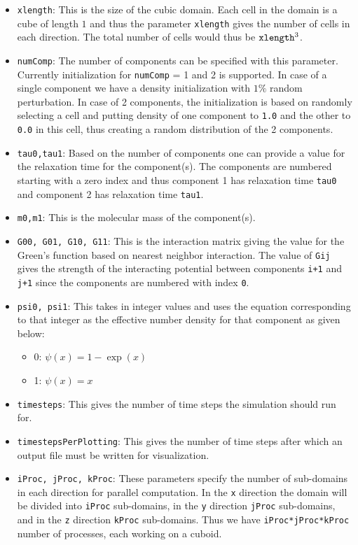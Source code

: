 \documentclass[11pt]{article}
\begin{document}
\begin{itemize}
	\item \verb|xlength|: This is the size of the cubic domain. Each cell in the domain is a cube of length $1$ and thus the parameter \verb|xlength| gives the number of cells in each direction. The total number of cells would thus be $\verb|xlength|^3$.
	\item \verb|numComp|: The number of components can be specified with this parameter. Currently initialization for \verb|numComp| = 1 and 2 is supported. In case of a single component we have a density initialization with $1\%$ random perturbation. In case of 2 components, the initialization is based on randomly selecting a cell and putting density of one component to \verb|1.0| and the other to \verb|0.0| in this cell, thus creating a random distribution of the 2 components.
	\item \verb|tau0,tau1|: Based on the number of components one can provide a value for the relaxation time for the component(s). The components are numbered starting with a zero index and thus component 1 has relaxation time \verb|tau0| and component 2 has relaxation time \verb|tau1|.
	\item \verb|m0,m1|: This is the molecular mass of the component(s).
	\item \verb|G00, G01, G10, G11|: This is the interaction matrix giving the value for the Green's function based on nearest neighbor interaction. The value of \verb|Gij| gives the strength of the interacting potential between components \verb|i+1| and \verb|j+1| since the components are numbered with index \verb|0|.
	\item \verb|psi0, psi1|: This takes in integer values and uses the equation corresponding to that integer as the effective number density for that component as given below:
	\begin{itemize}
		\item 0: $\psi(x) = 1-\exp(x)$
		\item 1: $\psi(x) = x$
	\end{itemize}
	\item \verb|timesteps|: This gives the number of time steps the simulation should run for.
	\item \verb|timestepsPerPlotting|: This gives the number of time steps after which an output file must be written for visualization.
	\item \verb|iProc, jProc, kProc|: These parameters specify the number of sub-domains in each direction for parallel computation. In the \verb|x| direction the domain will be divided into \verb|iProc| sub-domains, in the \verb|y| direction \verb|jProc| sub-domains, and in the \verb|z| direction \verb|kProc| sub-domains. Thus we have \verb|iProc*jProc*kProc| number of processes, each working on a cuboid.
\end{itemize}
\end{document}
